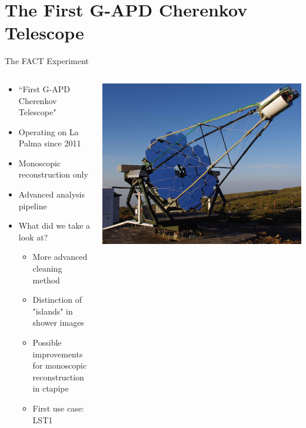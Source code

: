 \section{The First G-APD Cherenkov Telescope}

\begin{frame}{The FACT Experiment}
    \begin{columns}[T] %
        \begin{column}{.45\textwidth}
            \vspace{10pt}
            \begin{itemize}
                \item ``First G-APD Cherenkov Telescope"
                \item Operating on La Palma since 2011
                \item Monoscopic reconstruction only
                \item Advanced analysis pipeline
                \item What did we take a look at?
                \begin{itemize}
                    \item{More advanced cleaning method}
                    \item{Distinction of "islands" in shower images}
                    \item[\rightarrow] Possible improvements for monoscopic reconstruction in ctapipe
                    \item[\rightarrow] First use case: LST1
                \end{itemize}
            \end{itemize}
        \end{column}
        \begin{column}{.48\textwidth}
            \includegraphics[width=\linewidth]{images/fact_telescope.jpg}
            \cite{Anderhub_2013}
        \end{column}
    \end{columns}
\end{frame}
